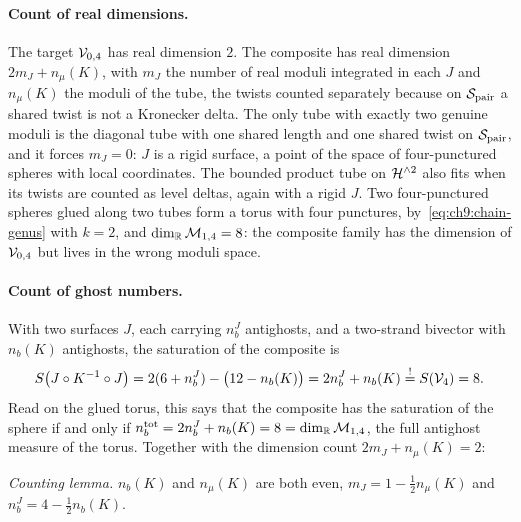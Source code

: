 \paragraph{Count of real dimensions.}
The target ${\mathcal{V}}_{0, 4}$ has real dimension $2$.
The composite has real dimension $2 m_J + n_\mu(K)$, with $m_J$ the number of real moduli integrated in each $J$ and $n_\mu(K)$ the moduli of the tube, the twists counted separately because on ${\mathcal{S}}_{\rm pair}$ a shared twist is not a Kronecker delta.
The only tube with exactly two genuine moduli is the diagonal tube with one shared length and one shared twist on ${\mathcal{S}}_{\rm pair}$, and it forces $m_J = 0$: $J$ is a rigid surface, a point of the space of four-punctured spheres with local coordinates.
The bounded product tube on $\mathcal{H}^{\wedge 2}$ also fits when its twists are counted as level deltas, again with a rigid $J$.
Two four-punctured spheres glued along two tubes form a torus with four punctures, by~\eqref{eq:ch9:chain-genus} with $k = 2$, and $\dim_{\mathbb{R}} {\mathcal{M}}_{1, 4} = 8$: the composite family has the dimension of ${\mathcal{V}}_{0, 4}$ but lives in the wrong moduli space.

\paragraph{Count of ghost numbers.}
With two surfaces $J$, each carrying $n_b^J$ antighosts, and a two-strand bivector with $n_b(K)$ antighosts, the saturation of the composite is
\begin{equation}
  \label{eq:ch9:ghost-count}
  S \big( J \circ K^{-1} \circ J \big)
    = 2 (6 + n_b^J) - \big( 12 - n_b(K) \big)
    = 2 n_b^J + n_b(K)
    \overset{!}{=} S(\mathcal{V}_{4})
    = 8.
\end{equation}
Read on the glued torus, this says that the composite has the saturation of the sphere if and only if $n_b^{\rm tot} = 2 n_b^J + n_b(K) = 8 = \dim_{\mathbb{R}} {\mathcal{M}}_{1, 4}$, the full antighost measure of the torus.
Together with the dimension count $2 m_J + n_\mu(K) = 2$:

\medskip

\noindent
\emph{Counting lemma.} $n_b(K)$ and $n_\mu(K)$ are both even, $m_J = 1 - \tfrac12 n_\mu(K)$ and $n_b^J = 4 - \tfrac12 n_b(K)$.

\medskip

